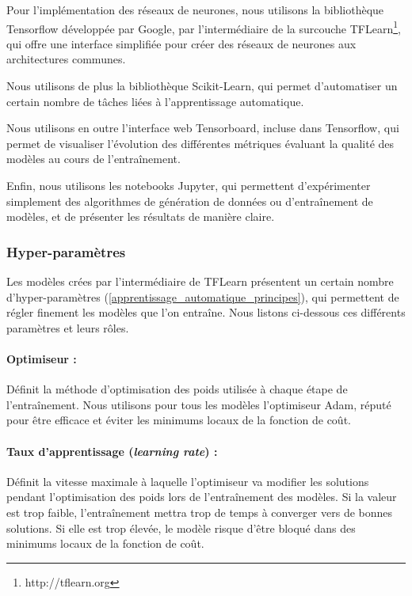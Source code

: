 \par Pour l'implémentation des réseaux de neurones, nous utilisons la bibliothèque Tensorflow\cite{tf} développée par Google, par l'intermédiaire de la surcouche TFLearn\footnote{http://tflearn.org}, qui offre une interface simplifiée pour créer des réseaux de neurones aux architectures communes.\\

\par Nous utilisons de plus la bibliothèque Scikit-Learn\cite{sklearn}, qui permet d'automatiser un certain nombre de tâches liées à l'apprentissage automatique.\\

\par Nous utilisons en outre l'interface web Tensorboard, incluse dans Tensorflow, qui permet de visualiser l'évolution des différentes métriques évaluant la qualité des modèles au cours de l'entraînement.\\

\par Enfin, nous utilisons les notebooks Jupyter\cite{jupyter}, qui permettent d'expérimenter simplement des algorithmes de génération de données ou d'entraînement de modèles, et de présenter les résultats de manière claire.

\subsubsection{Hyper-paramètres}

\label{apprentissage_automatique_parametres_nn}

\par Les modèles crées par l'intermédiaire de TFLearn présentent un certain nombre d'hyper-paramètres (\ref{apprentissage_automatique_principes}), qui permettent de régler finement les modèles que l'on entraîne. Nous listons ci-dessous ces différents paramètres et leurs rôles.

\paragraph{Optimiseur : } Définit la méthode d'optimisation des poids utilisée à chaque étape de l'entraînement. Nous utilisons pour tous les modèles l'optimiseur Adam\cite{adam}, réputé pour être efficace et éviter les minimums locaux de la fonction de coût.

\paragraph{Taux d'apprentissage (\emph{learning rate}) : } Définit la vitesse maximale à laquelle l'optimiseur va modifier les solutions pendant l'optimisation des poids lors de l'entraînement des modèles. Si la valeur est trop faible, l'entraînement mettra trop de temps à converger vers de bonnes solutions. Si elle est trop élevée, le modèle risque d'être bloqué dans des minimums locaux de la fonction de coût.

